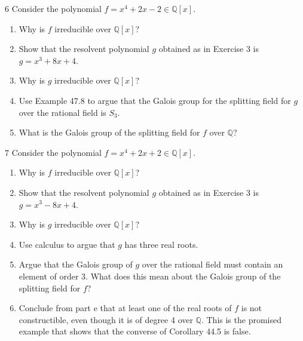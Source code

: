 \begin{problem}{6}
    Consider the polynomial $f = x^4 + 2x - 2 \in \mathbb{Q}[x]$.
    \begin{enumerate}
        \item[(a)] Why is $f$ irreducible over $\mathbb{Q}[x]$?
        \item[(b)] Show that the resolvent polynomial $g$ obtained as in Exercise 3 is
        $g = x^3 + 8x + 4$.
        \item[(c)] Why is $g$ irreducible over $\mathbb{Q}[x]$?
        \item[(d)] Use Example 47.8 to argue that the Galois group for the splitting field
        for $g$ over the rational field is $S_3$.
        \item[(e)] What is the Galois group of the splitting field for $f$ over
        $\mathbb{Q}$?
    \end{enumerate}
\end{problem}
\unsolved

\begin{problem}{7}
    Consider the polynomial $f = x^4 + 2x + 2 \in \mathbb{Q}[x]$.
    \begin{enumerate}
        \item[(a)] Why is $f$ irreducible over $\mathbb{Q}[x]$?
        \item[(b)] Show that the resolvent polynomial $g$ obtained as in Exercise 3 is
        $g = x^3 - 8x + 4$.
        \item[(c)] Why is $g$ irreducible over $\mathbb{Q}[x]$?
        \item[(d)] Use calculus to argue that $g$ has three real roots.
        \item[(e)] Argue that the Galois group of $g$ over the rational field must contain
        an element of order 3. What does this mean about the Galois group of the splitting
        field for $f$?
        \item[(f)] Conclude from part e that at least one of the real roots of $f$ is not
        constructible, even though it is of degree 4 over $\mathbb{Q}$. This is the
        promised example that shows that the converse of Corollary 44.5 is false.
    \end{enumerate}
\end{problem}
\unsolved
